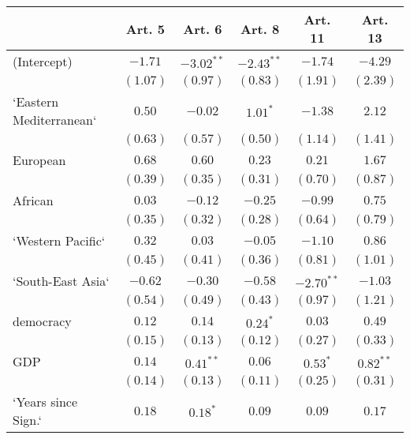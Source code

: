 
\begin{table}[!h]
\begin{center}
\begin{tabular}{l c c c c c }
\toprule
 & Art. 5 & Art. 6 & Art. 8 & Art. 11 & Art. 13 \\
\midrule
(Intercept)             & $-1.71$      & $-3.02^{**}$ & $-2.43^{**}$ & $-1.74$      & $-4.29$      \\
                        & $(1.07)$     & $(0.97)$     & $(0.83)$     & $(1.91)$     & $(2.39)$     \\
`Eastern Mediterranean` & $0.50$       & $-0.02$      & $1.01^{*}$   & $-1.38$      & $2.12$       \\
                        & $(0.63)$     & $(0.57)$     & $(0.50)$     & $(1.14)$     & $(1.41)$     \\
European                & $0.68$       & $0.60$       & $0.23$       & $0.21$       & $1.67$       \\
                        & $(0.39)$     & $(0.35)$     & $(0.31)$     & $(0.70)$     & $(0.87)$     \\
African                 & $0.03$       & $-0.12$      & $-0.25$      & $-0.99$      & $0.75$       \\
                        & $(0.35)$     & $(0.32)$     & $(0.28)$     & $(0.64)$     & $(0.79)$     \\
`Western Pacific`       & $0.32$       & $0.03$       & $-0.05$      & $-1.10$      & $0.86$       \\
                        & $(0.45)$     & $(0.41)$     & $(0.36)$     & $(0.81)$     & $(1.01)$     \\
`South-East Asia`       & $-0.62$      & $-0.30$      & $-0.58$      & $-2.70^{**}$ & $-1.03$      \\
                        & $(0.54)$     & $(0.49)$     & $(0.43)$     & $(0.97)$     & $(1.21)$     \\
democracy               & $0.12$       & $0.14$       & $0.24^{*}$   & $0.03$       & $0.49$       \\
                        & $(0.15)$     & $(0.13)$     & $(0.12)$     & $(0.27)$     & $(0.33)$     \\
GDP                     & $0.14$       & $0.41^{**}$  & $0.06$       & $0.53^{*}$   & $0.82^{**}$  \\
                        & $(0.14)$     & $(0.13)$     & $(0.11)$     & $(0.25)$     & $(0.31)$     \\
`Years since Sign.`     & $0.18$       & $0.18^{*}$   & $0.09$       & $0.09$       & $0.17$       \\

\end{tabular}
\end{center}
\end{table}
